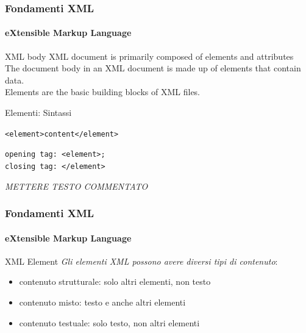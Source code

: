 \begin{frame}
    \frametitle{Fondamenti XML}
    \framesubtitle{eXtensible Markup Language}
    \addtocounter{nframe}{1}

	\begin{block}{XML body}
	XML document is primarily composed of elements and attributes\\
	   The document body in an XML document is made up of elements that contain data.
	   \\ Elements are the basic building blocks of XML files.
    \end{block}

    \begin{block}{Elementi: Sintassi}
    \begin{center}\texttt{<element>content</element>}\end{center}
    \begin{center}\texttt{opening tag: <element>;\\ closing tag: </element>}\end{center}
    \end{block}
	\textit{METTERE TESTO COMMENTATO}
\end{frame}

\begin{frame}
    \frametitle{Fondamenti XML}
    \framesubtitle{eXtensible Markup Language}
    \addtocounter{nframe}{1}

	\begin{block}{XML Element}
		\textit{Gli elementi XML possono avere diversi tipi di contenuto}:
		\begin{itemize}
			\item contenuto strutturale: solo altri elementi, non testo
			\item contenuto misto: testo e anche altri elementi
			\item contenuto testuale: solo testo, non altri elementi
		\end{itemize}
	\end{block}
	
\end{frame}

